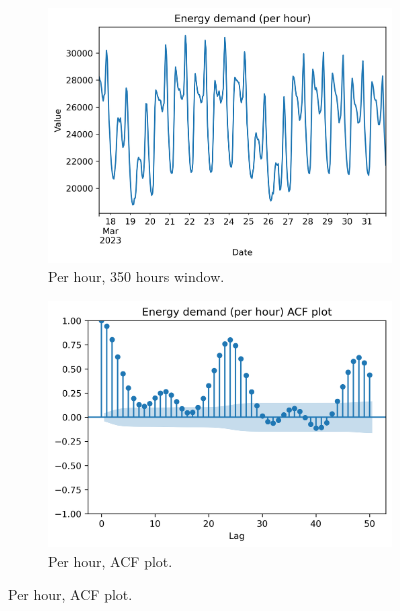 \begin{figure}[H]
\centering
    \begin{subfigure}{.435\textwidth}
        \centering
        \includegraphics[width=1\linewidth]{images/variable_analysis/esios_demand_h_350}
        \caption{Per hour, 350 hours window.}
    \end{subfigure}
    \begin{subfigure}{.45\textwidth}
        \centering
        \includegraphics[width=1\linewidth]{images/variable_analysis/esios_demand_h_acf}
        \caption{Per hour, ACF plot.}
    \end{subfigure}
\end{figure}


